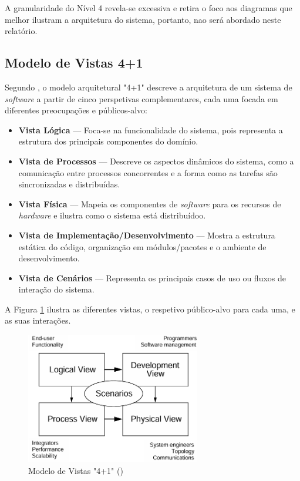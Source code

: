A granularidade do Nível 4 revela-se excessiva e retira o foco aos diagramas que melhor ilustram a arquitetura do sistema, portanto, nao será abordado neste relatório.

\subsection{Modelo de Vistas 4+1}
\label{subsec:model4plus1}

Segundo \cite{Kruchten1995}, o modelo arquitetural "4+1" descreve a arquitetura de um sistema de \textit{software} a partir de cinco perspetivas complementares, cada uma focada em diferentes preocupações e públicos-alvo:

\begin{itemize}
\item \textbf{Vista Lógica} — Foca-se na funcionalidade do sistema, pois representa a estrutura dos principais componentes do domínio.

\item \textbf{Vista de Processos} — Descreve os aspectos dinâmicos do sistema, como a comunicação entre processos concorrentes e a forma como as tarefas são sincronizadas e distribuídas.

\item \textbf{Vista Física} — Mapeia os componentes de \textit{software} para os recursos de \textit{hardware} e ilustra como o sistema está distribuídoo.

\item \textbf{Vista de Implementação/Desenvolvimento} — Mostra a estrutura estática do código, organização em módulos/pacotes e o ambiente de desenvolvimento.

\item \textbf{Vista de Cenários} — Representa os principais casos de uso ou fluxos de interação do sistema.
\end{itemize}

A Figura \ref{fig:41viewmodel} ilustra as diferentes vistas, o respetivo público-alvo para cada uma, e as suas interações.

\begin{figure}[H]
    \centering
    \includegraphics[width=3in,keepaspectratio]{frontmatter/assets/models/4+1views.png}
    \caption{Modelo de Vistas "4+1" (\cite{Kruchten1995})}
    \label{fig:41viewmodel}
\end{figure}

